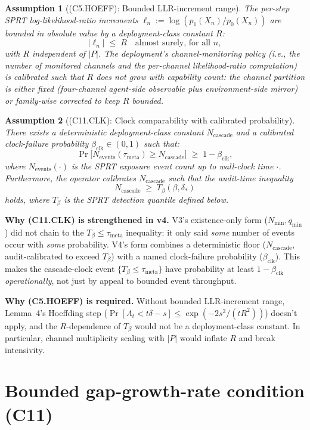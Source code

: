 \documentclass{article}
\newtheorem{assumption}{Assumption}
\newcommand{\deltastar}{\delta_{*}}
\newcommand{\Tbeta}{T_{\beta}}
\newcommand{\Ncasc}{N_{\mathrm{cascade}}}
\newcommand{\Nev}{N_{\mathrm{events}}}
\newcommand{\bclk}{\beta_{\mathrm{clk}}}
\begin{document}
\begin{assumption}[(C5.HOEFF): Bounded LLR-increment range]
\label{ass:C5HOEFF}
The per-step SPRT log-likelihood-ratio increments
$\ell_n := \log(p_1(X_n)/p_0(X_n))$ are bounded in absolute value
by a deployment-class constant $R$:
\[
  |\ell_n| \;\leq\; R \quad \text{almost surely, for all } n,
\]
with $R$ independent of $|P|$.  The deployment's channel-monitoring
policy (i.e., the number of monitored channels and the per-channel
likelihood-ratio computation) is calibrated such that $R$ does not
grow with capability count: the channel partition is either fixed
(four-channel agent-side observable plus environment-side mirror)
or family-wise corrected to keep $R$ bounded.
\end{assumption}

\begin{assumption}[(C11.CLK): Clock comparability with calibrated probability]
\label{ass:C11CLK}
There exists a deterministic deployment-class constant $\Ncasc$ and
a calibrated clock-failure probability $\bclk \in (0,1)$ such that:
\[
  \Pr\bigl[\Nev(\tau_{\mathrm{meta}}) \geq \Ncasc\bigr] \;\geq\;
  1 - \bclk,
\]
where $\Nev(\cdot)$ is the SPRT exposure event count up to wall-clock
time $\cdot$.  Furthermore, the operator calibrates $\Ncasc$ such
that the audit-time inequality
\[
  \Ncasc \;\geq\; \Tbeta(\beta, \deltastar)
\]
holds, where $\Tbeta$ is the SPRT detection quantile defined below.
\end{assumption}

\textbf{Why (C11.CLK) is strengthened in v4.}  V3's existence-only
form ($N_{\min}, q_{\min}$) did not chain to the
$\Tbeta \leq \tau_{\mathrm{meta}}$ inequality: it only said
\emph{some} number of events occur with \emph{some} probability.
V4's form combines a deterministic floor ($\Ncasc$, audit-calibrated
to exceed $\Tbeta$) with a named clock-failure probability
($\bclk$).  This makes the cascade-clock event $\{\Tbeta \leq
\tau_{\mathrm{meta}}\}$ have probability at least $1 - \bclk$
\emph{operationally}, not just by appeal to bounded event throughput.

\textbf{Why (C5.HOEFF) is required.}  Without bounded LLR-increment
range, Lemma~4's Hoeffding step
($\Pr[\Lambda_t < t\delta - s] \leq \exp(-2s^2/(tR^2))$) doesn't
apply, and the $R$-dependence of $\Tbeta$ would not be a
deployment-class constant.  In particular, channel multiplicity
scaling with $|P|$ would inflate $R$ and break intensivity.

\section{Bounded gap-growth-rate condition (C11)}
\end{document}
